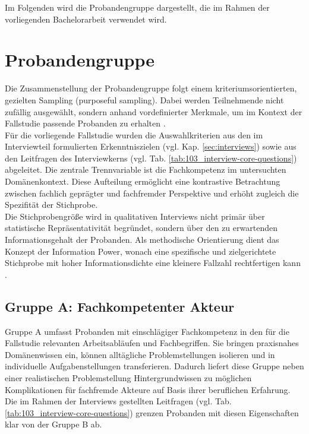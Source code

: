 Im Folgenden wird die Probandengruppe dargestellt, die im Rahmen der vorliegenden Bachelorarbeit verwendet wird.

\section{Probandengruppe}
\label{sec:probandengruppe}

Die Zusammenstellung der Probandengruppe folgt einem kriteriumsorientierten, gezielten Sampling (purposeful sampling). 
Dabei werden Teilnehmende nicht zufällig ausgewählt, sondern anhand vordefinierter Merkmale, um im Kontext der Fallstudie passende Probanden zu erhalten \cite{palinkas2015purposefulsampling}. \\

Für die vorliegende Fallstudie wurden die Auswahlkriterien aus den im Interviewteil formulierten Erkenntniszielen (vgl. Kap. \ref{sec:interviews}) 
sowie aus den Leitfragen des Interviewkerns (vgl. Tab. \ref{tab:103_interview-core-questions}) abgeleitet. 
Die zentrale Trennvariable ist die Fachkompetenz im untersuchten Domänenkontext. 
Diese Aufteilung ermöglicht eine kontrastive Betrachtung zwischen fachlich geprägter und fachfremder Perspektive und erhöht zugleich die Spezifität der Stichprobe. \\

Die Stichprobengröße wird in qualitativen Interviews nicht primär über statistische Repräsentativität begründet, sondern über den zu erwartenden Informationsgehalt der Probanden. 
Als methodische Orientierung dient das Konzept der Information Power, wonach eine spezifische und zielgerichtete Stichprobe mit hoher Informationsdichte eine kleinere Fallzahl rechtfertigen kann \cite{malterud2016samplesize}. 

\subsection{Gruppe A: Fachkompetenter Akteur} 
\label{sec:probandengruppe-a}

Gruppe A umfasst Probanden mit einschlägiger Fachkompetenz in den für die Fallstudie relevanten Arbeitsabläufen und Fachbegriffen. 
Sie bringen praxisnahes Domänenwissen ein, können alltägliche Problemstellungen isolieren und in individuelle Aufgabenstellungen transferieren.
Dadurch liefert diese Gruppe neben einer realistischen Problemstellung Hintergrundwissen zu möglichen Komplikationen für fachfremde Akteure auf Basis ihrer beruflichen Erfahrung.
Die im Rahmen der Interviews gestellten Leitfragen (vgl. Tab. \ref{tab:103_interview-core-questions}) grenzen Probanden mit diesen Eigenschaften klar von der Gruppe B ab.

